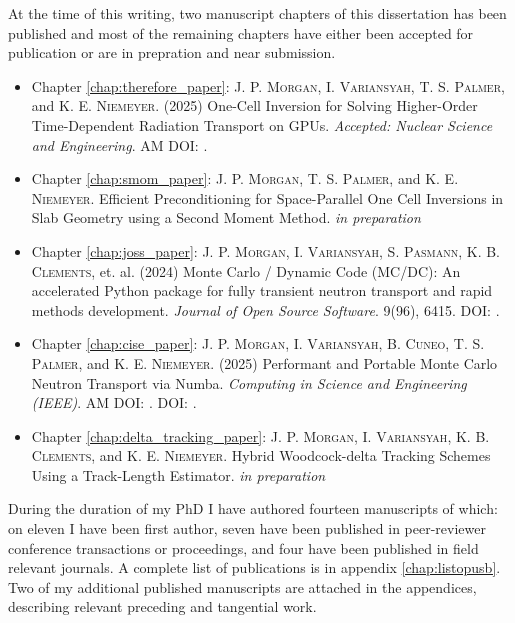 At the time of this writing, two manuscript chapters of this dissertation has been published and most of the remaining chapters have either been accepted for publication or are in prepration and near submission.
\begin{itemize}
    \item Chapter \ref{chap:therefore_paper}: \textsc{J. P. Morgan}, \textsc{I. Variansyah}, \textsc{T. S. Palmer}, and \textsc{K. E. Niemeyer}. (2025) One-Cell Inversion for Solving Higher-Order Time-Dependent Radiation Transport on GPUs. \emph{Accepted: Nuclear Science and Engineering}. AM DOI: .

    \item Chapter \ref{chap:smom_paper}: \textsc{J. P. Morgan},  \textsc{T. S. Palmer}, and \textsc{K. E. Niemeyer}. Efficient Preconditioning for Space-Parallel One Cell Inversions in Slab Geometry using a Second Moment Method. \emph{in preparation}

    \item Chapter \ref{chap:joss_paper}: \textsc{J. P. Morgan}, \textsc{I. Variansyah}, \textsc{S. Pasmann}, \textsc{K. B. Clements}, et. al. (2024) Monte Carlo / Dynamic Code (MC/DC): An accelerated Python package for fully transient neutron transport and rapid methods development. \emph{Journal of Open Source Software}. 9(96), 6415. DOI: .

    \item Chapter \ref{chap:cise_paper}: \textsc{J. P. Morgan}, \textsc{I. Variansyah}, \textsc{B. Cuneo}, \textsc{T. S. Palmer}, and \textsc{K. E. Niemeyer}. (2025) Performant and Portable Monte Carlo Neutron Transport via Numba. \emph{Computing in Science and Engineering (IEEE)}. AM DOI: . DOI: .

    \item Chapter \ref{chap:delta_tracking_paper}: \textsc{J. P. Morgan}, \textsc{I. Variansyah}, \textsc{K. B. Clements}, and \textsc{K. E. Niemeyer}. Hybrid Woodcock-delta Tracking Schemes Using a Track-Length Estimator. \emph{in preparation}
    
\end{itemize}

During the duration of my PhD I have authored fourteen manuscripts of which: on eleven I have been first author, seven have been published in peer-reviewer conference transactions or proceedings, and four have been published in field relevant journals.
A complete list of publications is in appendix \ref{chap:listopusb}.
Two of my additional published manuscripts are attached in the appendices, describing relevant preceding and tangential work.